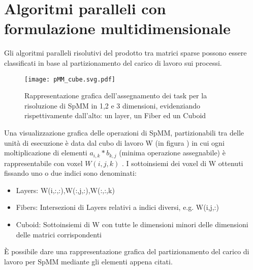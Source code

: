 \section{Algoritmi paralleli con formulazione multidimensionale} 
Gli algoritmi paralleli risolutivi del prodotto tra matrici sparse possono essere
classificati in base al partizionamento del carico di lavoro sui processi.\\
\begin{figure}[H]
  \centering \texttt{[image: pMM\_cube.svg.pdf]} 
  \caption[cubo di lavoro per SpMM]
  {Rappresentazione grafica dell'assegnamento dei task per la risoluzione
      di SpMM in 1,2 e 3 dimensioni, evidenziando rispettivamente dall'alto: un layer, un Fiber ed un Cuboid}\decoRule \label{fig:pMM_cube}
\end{figure}
Una visualizzazione grafica delle operazioni di SpMM, partizionabili tra delle unità di esecuzione
è data dal cubo di lavoro W (in figura )
in cui ogni moltiplicazione di elementi \nnz $a_{i,k}*b_{k,j}$ (minima operazione assegnabile) 
è rappresentabile con voxel $W(i,j,k)$ .
\voidLine
\label{ChExistingTecqs:workCube}
I sottoinsiemi dei voxel di W ottenuti fissando uno o due indici sono denominati:
\begin{itemize}
  \item Layers: W(i,:,:),W(:,j,:),W(:,:,k)
  \item Fibers: Intersezioni di Layers relativi a indici diversi, e.g. W(i,j,:)
  \item Cuboid: Sottoinsiemi di W con tutte le dimensioni minori delle 
   dimensioni delle matrici corrispondenti
\end{itemize}
È possibile dare una rappresentazione grafica del partizionamento del carico di lavoro per SpMM 
mediante gli elementi appena citati.\\

